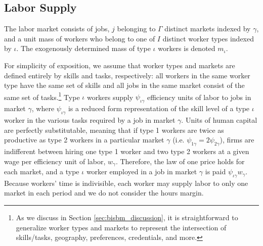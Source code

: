 \documentclass[12pt]{article}
\def\ig{\iota\gamma}
\def\g{\gamma}
\def\i{\iota}
\theoremstyle{definition}
\theoremstyle{plain}
\begin{document}
\subsection{Labor Supply}

The labor market consists of jobs, $j$ belonging to $\Gamma$ distinct markets indexed by $\g$, and a unit mass of workers who belong to one of $I$ distinct worker types indexed by $\i$. The exogenously determined mass of type $\i$ workers is denoted $m_\i$. 

For simplicity of exposition, we assume that worker types and markets are defined entirely by skills and tasks, respectively: all workers in the same worker type have the same set of skills and all jobs in the same market consist of the same set of tasks.\footnote{As we discuss in Section \ref{sec:bisbm_discussion}, it is straightforward to generalize worker types and markets to represent the intersection of skills/tasks, geography, preferences, credentials, and more.} Type $\i$ workers  supply $\psi_{\ig}$ efficiency units of labor to jobs in market $\g$, where $\psi_{\ig}$ is a reduced form representation of the skill level of a type $\i$ worker in the various tasks required by a job in market $\g$. Units of human capital are perfectly substitutable, meaning that if type 1 workers are twice as productive as type 2 workers in a particular market $\g$ (i.e. $\psi_{1\g} = 2\psi_{2\g}$), firms are indifferent between hiring one type 1 worker and two type 2 workers at a given wage per efficiency unit of labor, $w_{\g}$. Therefore, the law of one price holds for each market, and a type $\i$ worker employed in a job in market $\g$ is paid $\psi_{\ig}w_{\g}$. Because workers' time is indivisible, each worker may supply labor to only one market in each period and we do not consider the hours margin.
\end{document}
